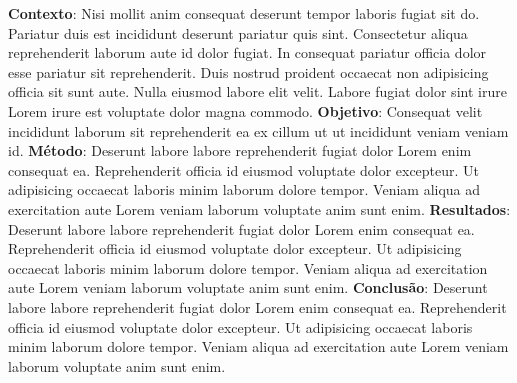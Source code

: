 
\centeredchapterstyle
\begin{resumo}
    \noindent\textbf{Contexto}: Nisi mollit anim consequat deserunt tempor laboris fugiat sit do. Pariatur duis est incididunt deserunt pariatur quis sint. Consectetur aliqua reprehenderit laborum aute id dolor fugiat. In consequat pariatur officia dolor esse pariatur sit reprehenderit. Duis nostrud proident occaecat non adipisicing officia sit sunt aute. Nulla eiusmod labore elit velit. Labore fugiat dolor sint irure Lorem irure est voluptate dolor magna commodo. \textbf{Objetivo}: Consequat velit incididunt laborum sit reprehenderit ea ex cillum ut ut incididunt veniam veniam id. \textbf{Método}: Deserunt labore labore reprehenderit fugiat dolor Lorem enim consequat ea. Reprehenderit officia id eiusmod voluptate dolor excepteur. Ut adipisicing occaecat laboris minim laborum dolore tempor. Veniam aliqua ad exercitation aute Lorem veniam laborum voluptate anim sunt enim. \textbf{Resultados}: Deserunt labore labore reprehenderit fugiat dolor Lorem enim consequat ea. Reprehenderit officia id eiusmod voluptate dolor excepteur. Ut adipisicing occaecat laboris minim laborum dolore tempor. Veniam aliqua ad exercitation aute Lorem veniam laborum voluptate anim sunt enim. \textbf{Conclusão}: Deserunt labore labore reprehenderit fugiat dolor Lorem enim consequat ea. Reprehenderit officia id eiusmod voluptate dolor excepteur. Ut adipisicing occaecat laboris minim laborum dolore tempor. Veniam aliqua ad exercitation aute Lorem veniam laborum voluptate anim sunt enim.
\end{resumo}